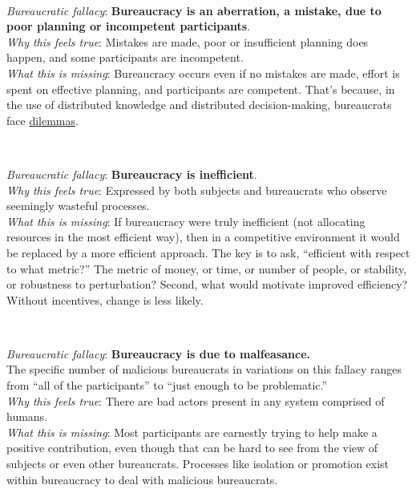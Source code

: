 \ \\
\begin{samepage}
\textit{Bureaucratic fallacy}: \textbf{Bureaucracy is an aberration, a mistake, due to poor planning or incompetent participants}. \\
\textit{Why this feels true}: Mistakes are made, poor or insufficient planning does happen, and some participants are incompetent.\\
\textit{What this is missing}: Bureaucracy occurs even if no mistakes are made, effort is spent on effective planning, and participants are competent. That's because, in the use of distributed knowledge and distributed decision-making, bureaucrats face \hyperref[sec:dilemma-trilemma]{dilemmas}.
\end{samepage}

\ \\
\begin{samepage}
\textit{Bureaucratic fallacy}: \textbf{Bureaucracy is inefficient}. \\
\textit{Why this feels true}: Expressed by both subjects and bureaucrats who observe seemingly wasteful processes.\\
\textit{What this is missing}: If bureaucracy were truly inefficient (not allocating resources in the most efficient way), then in a competitive environment it would be replaced by a more efficient approach. The key is to ask, ``efficient with respect to what metric?'' The metric of money, or time, or number of people, or stability, or robustness to perturbation?  Second, what would motivate improved efficiency? Without incentives, change is less likely. 
\end{samepage}

\ \\
\begin{samepage}
\textit{Bureaucratic fallacy}: \textbf{Bureaucracy is due to malfeasance.}\\
The specific number of malicious bureaucrats in variations on this fallacy ranges from ``all of the participants'' to ``just enough to be problematic.'' \\
\textit{Why this feels true}: There are bad actors present in any system comprised of humans. \\
\textit{What this is missing}: Most participants are earnestly trying to help make a positive contribution, even though that can be hard to see from the view of subjects or even other bureaucrats. Processes like isolation or promotion exist within bureaucracy to deal with malicious bureaucrats.
\end{samepage}

